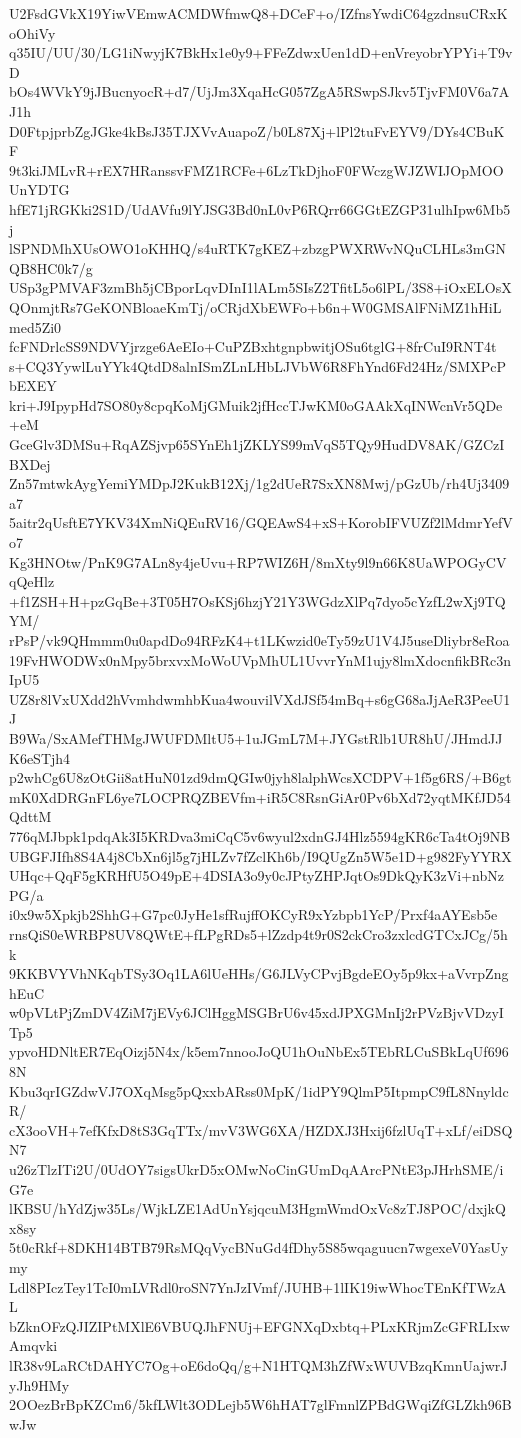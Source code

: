 U2FsdGVkX19YiwVEmwACMDWfmwQ8+DCeF+o/IZfnsYwdiC64gzdnsuCRxKoOhiVy
q35IU/UU/30/LG1iNwyjK7BkHx1e0y9+FFeZdwxUen1dD+enVreyobrYPYi+T9vD
bOs4WVkY9jJBucnyocR+d7/UjJm3XqaHcG057ZgA5RSwpSJkv5TjvFM0V6a7AJ1h
D0FtpjprbZgJGke4kBsJ35TJXVvAuapoZ/b0L87Xj+lPl2tuFvEYV9/DYs4CBuKF
9t3kiJMLvR+rEX7HRanssvFMZ1RCFe+6LzTkDjhoF0FWczgWJZWIJOpMOOUnYDTG
hfE71jRGKki2S1D/UdAVfu9lYJSG3Bd0nL0vP6RQrr66GGtEZGP31ulhIpw6Mb5j
lSPNDMhXUsOWO1oKHHQ/s4uRTK7gKEZ+zbzgPWXRWvNQuCLHLs3mGNQB8HC0k7/g
USp3gPMVAF3zmBh5jCBporLqvDInI1lALm5SIsZ2TfitL5o6lPL/3S8+iOxELOsX
QOnmjtRs7GeKONBloaeKmTj/oCRjdXbEWFo+b6n+W0GMSAlFNiMZ1hHiLmed5Zi0
fcFNDrlcSS9NDVYjrzge6AeEIo+CuPZBxhtgnpbwitjOSu6tglG+8frCuI9RNT4t
s+CQ3YywlLuYYk4QtdD8alnISmZLnLHbLJVbW6R8FhYnd6Fd24Hz/SMXPcPbEXEY
kri+J9IpypHd7SO80y8cpqKoMjGMuik2jfHccTJwKM0oGAAkXqINWcnVr5QDe+eM
GceGlv3DMSu+RqAZSjvp65SYnEh1jZKLYS99mVqS5TQy9HudDV8AK/GZCzIBXDej
Zn57mtwkAygYemiYMDpJ2KukB12Xj/1g2dUeR7SxXN8Mwj/pGzUb/rh4Uj3409a7
5aitr2qUsftE7YKV34XmNiQEuRV16/GQEAwS4+xS+KorobIFVUZf2lMdmrYefVo7
Kg3HNOtw/PnK9G7ALn8y4jeUvu+RP7WIZ6H/8mXty9l9n66K8UaWPOGyCVqQeHlz
+f1ZSH+H+pzGqBe+3T05H7OsKSj6hzjY21Y3WGdzXlPq7dyo5cYzfL2wXj9TQYM/
rPsP/vk9QHmmm0u0apdDo94RFzK4+t1LKwzid0eTy59zU1V4J5useDliybr8eRoa
19FvHWODWx0nMpy5brxvxMoWoUVpMhUL1UvvrYnM1ujy8lmXdocnfikBRc3nIpU5
UZ8r8lVxUXdd2hVvmhdwmhbKua4wouvilVXdJSf54mBq+s6gG68aJjAeR3PeeU1J
B9Wa/SxAMefTHMgJWUFDMltU5+1uJGmL7M+JYGstRlb1UR8hU/JHmdJJK6eSTjh4
p2whCg6U8zOtGii8atHuN01zd9dmQGIw0jyh8lalphWcsXCDPV+1f5g6RS/+B6gt
mK0XdDRGnFL6ye7LOCPRQZBEVfm+iR5C8RsnGiAr0Pv6bXd72yqtMKfJD54QdttM
776qMJbpk1pdqAk3I5KRDva3miCqC5v6wyul2xdnGJ4Hlz5594gKR6cTa4tOj9NB
UBGFJIfh8S4A4j8CbXn6jl5g7jHLZv7fZclKh6b/I9QUgZn5W5e1D+g982FyYYRX
UHqc+QqF5gKRHfU5O49pE+4DSIA3o9y0cJPtyZHPJqtOs9DkQyK3zVi+nbNzPG/a
i0x9w5Xpkjb2ShhG+G7pc0JyHe1sfRujffOKCyR9xYzbpb1YcP/Prxf4aAYEsb5e
rnsQiS0eWRBP8UV8QWtE+fLPgRDs5+lZzdp4t9r0S2ckCro3zxlcdGTCxJCg/5hk
9KKBVYVhNKqbTSy3Oq1LA6lUeHHs/G6JLVyCPvjBgdeEOy5p9kx+aVvrpZnghEuC
w0pVLtPjZmDV4ZiM7jEVy6JClHggMSGBrU6v45xdJPXGMnIj2rPVzBjvVDzyITp5
ypvoHDNltER7EqOizj5N4x/k5em7nnooJoQU1hOuNbEx5TEbRLCuSBkLqUf6968N
Kbu3qrIGZdwVJ7OXqMsg5pQxxbARss0MpK/1idPY9QlmP5ItpmpC9fL8NnyldcR/
cX3ooVH+7efKfxD8tS3GqTTx/mvV3WG6XA/HZDXJ3Hxij6fzlUqT+xLf/eiDSQN7
u26zTlzITi2U/0UdOY7sigsUkrD5xOMwNoCinGUmDqAArcPNtE3pJHrhSME/iG7e
lKBSU/hYdZjw35Ls/WjkLZE1AdUnYsjqcuM3HgmWmdOxVc8zTJ8POC/dxjkQx8sy
5t0cRkf+8DKH14BTB79RsMQqVycBNuGd4fDhy5S85wqaguucn7wgexeV0YasUymy
Ldl8PIczTey1TcI0mLVRdl0roSN7YnJzIVmf/JUHB+1lIK19iwWhocTEnKfTWzAL
bZknOFzQJIZIPtMXlE6VBUQJhFNUj+EFGNXqDxbtq+PLxKRjmZcGFRLIxwAmqvki
lR38v9LaRCtDAHYC7Og+oE6doQq/g+N1HTQM3hZfWxWUVBzqKmnUajwrJyJh9HMy
2OOezBrBpKZCm6/5kfLWlt3ODLejb5W6hHAT7glFmnlZPBdGWqiZfGLZkh96BwJw
